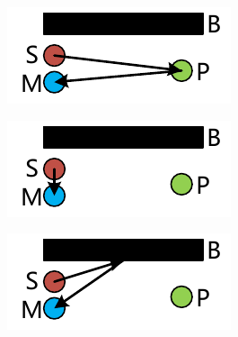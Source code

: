 \begin{figure}[!htp]
  \centering
  \begin{subfigure}[b]{0.49\textwidth}
    \includegraphics[width=\textwidth]{figure/signal-path-pen-hand-reflected-path}
    \caption{}
    \label{fig:signal-path-pen-hand-reflected-path}
  \end{subfigure}
  \begin{subfigure}[b]{0.49\textwidth}
    \includegraphics[width=\textwidth]{figure/signal-path-direct-path}
    \caption{}
    \label{fig:signal-path-direct-path}
  \end{subfigure}
  \begin{subfigure}[b]{0.49\textwidth}
    \includegraphics[width=\textwidth]{figure/signal-path-static-multipath}
    \caption{}
    \label{fig:signal-path-static-multipath}
  \end{subfigure}

\end{figure}
